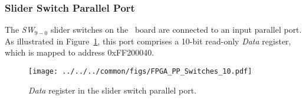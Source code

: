 \subsubsection{Slider Switch Parallel Port}

The {\it SW}$_{9-0}$ slider switches on the \DEBoard~board are connected to an input parallel
port.  As illustrated in Figure~\ref{fig:slider_port}, this port 
comprises a 10-bit read-only {\it Data} register, which is mapped to address {\sf 0xFF200040}.

\begin{figure}[h!]
   \begin{center}
       \texttt{[image: ../../../common/figs/FPGA\_PP\_Switches\_10.pdf]}
   \end{center}
   \caption{{\it Data} register in the slider switch parallel port.}
	\label{fig:slider_port}
\end{figure}

